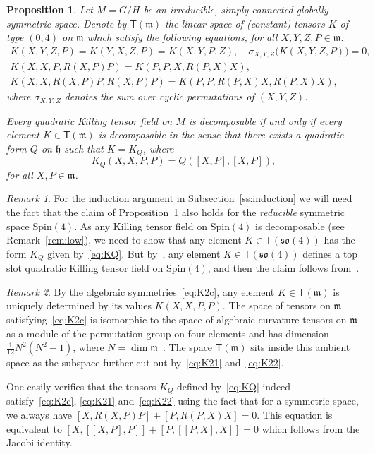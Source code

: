 \documentclass[12pt,reqno]{amsart}
\newcommand \Spin{\mathrm{Spin}}
\newcommand \sT{\mathsf{T}}
\newcommand\h{\mathfrak h}
\newcommand\m{\mathfrak m}
\newcommand \so{\mathfrak{so}}
\newcommand \<{\langle}
\renewcommand \>{\rangle}
\newtheorem{proposition}{Proposition}
\theoremstyle{definition}
\theoremstyle{remark}
\newtheorem{remark}{Remark}
\begin{document}
	\begin{proposition} \label{p:topslot2}
		Let $M= G/H$ be an irreducible, simply connected globally symmetric space. Denote by $\sT(\m)$ the linear space of (constant) tensors $K$ of type $(0,4)$ on $\m$ which satisfy the following equations, for all $X, Y, Z, P \in \m$:
		\begin{gather}
			K(X,Y,Z,P) = K(Y,X,Z,P) = K(X,Y,P,Z), \quad \sigma_{X,Y,Z} \big(K(X,Y,Z,P)\big)=0, \label{eq:K2c}\\
			K(X,X,P,R(X,P)P)=K(P,P,X,R(P,X)X), \label{eq:K21}\\
			K(X,X,R(X,P)P,R(X,P)P)=K(P,P,R(P,X)X,R(P,X)X), \label{eq:K22}
		\end{gather}
		where $\sigma_{X,Y,Z}$ denotes the sum over cyclic permutations of $(X,Y,Z)$.
		
		Every quadratic Killing tensor field on $M$ is decomposable if and only if every element $K \in \sT(\m)$ is decomposable in the sense that there exists a quadratic form $Q$ on $\h$ such that $K=K_Q$, where
		\begin{equation} \label{eq:KQ}
			K_Q(X,X,P,P) = Q([X,P],[X,P]),
		\end{equation}
		for all $X, P \in \m$.
	\end{proposition}
    \begin{remark} \label{rem:Spin4}
      For the induction argument in Subsection~\ref{ss:induction} we will need the fact that the claim of Proposition~\ref{p:topslot2} also holds for the \emph{reducible} symmetric space $\Spin(4)$. As any Killing tensor field on $\Spin(4)$ is decomposable (see Remark~\ref{rem:low}), we need to show that any element $K \in \sT(\so(4))$ has the form $K_Q$ given by~\eqref{eq:KQ}. But by~\cite[Proposition~2]{MN2}, any element $K \in \sT(\so(4))$ defines a top slot quadratic Killing tensor field on $\Spin(4)$, and then the claim follows from~\cite[Remark~3]{MN2}.
    \end{remark}
	\begin{remark} \label{rem:dim}
		By the algebraic symmetries~\eqref{eq:K2c}, any element $K \in \sT(\m)$ is uniquely determined by its values $K(X,X,P,P)$. The space of tensors on $\m$ satisfying~\eqref{eq:K2c} is isomorphic to the space of algebraic curvature tensors on $\m$ as a module of the permutation group on four elements and has dimension $\frac{1}{12} N^2(N^2-1)$, where $N = \dim \m$~\cite[Remark~3]{MN2}. The space $\sT(\m)$ sits inside this ambient space as the subspace further cut out by~\eqref{eq:K21} and~\eqref{eq:K22}.
		
		One easily verifies that the tensors $K_Q$ defined by~\eqref{eq:KQ} indeed satisfy~\eqref{eq:K2c}, \eqref{eq:K21} and~\eqref{eq:K22} using the fact that for a symmetric space, we always have $[X,R(X,P)P]+[P,R(P,X)X]=0$. This equation is equivalent to $[X,[[X,P],P]]+[P,[[P,X],X]]=0$ which follows from the Jacobi identity.
	\end{remark}
	
\end{document}

